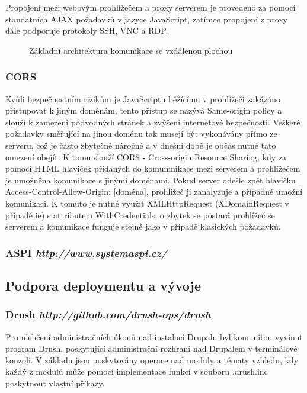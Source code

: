 Propojení mezi webovým prohlížečem a proxy serverem je provedeno za pomocí standatních AJAX požadavků v jazyce JavaScript, zatímco propojení z proxy dále podporuje protokoly SSH, VNC a RDP.

\begin{figure}[htp] 
  \caption{Základní architektura komunikace se vzdálenou plochou}
  \label{fig:arch_core}
\end{figure}  

\subsubsection*{CORS} 
Kvůli bezpečnostním rizikům je JavaScriptu běžícímu v prohlížeči zakázáno přistupovat k jiným doménám, tento přístup se nazývá Same-origin policy a slouží k zamezení podvodných stránek a zvýšení internetové bezpečnosti. Veškeré požadavky směřující na jinou doménu tak musejí být vykonávány přímo ze serveru, což je často zbytečně náročné a v dnešní době je občas nutné tato omezení obejít. K tomu slouží CORS - Cross-origin Resource Sharing, kdy za pomocí HTML hlaviček přidaných do komumnikace mezi serverem a prohlížečem je umožněna komunikace s jinými doménami. Pokud server odešle zpět hlavičku Access-Control-Allow-Origin: [doména], prohlížeč ji zanalyzuje a případně umožní komunikaci. K tomuto je nutné využít XMLHttpRequest (XDomainRequest v případě \gls{ie}) s attributem WithCredentials, o zbytek se postará prohlížeč se serverem a komunikace funguje stejně jako v případě klasických požadavků.

\subsubsection*{ASPI \hfill \emph{http://www.systemaspi.cz/}}

\subsection{Podpora deploymentu a vývoje}

\subsubsection*{Drush \hfill \emph{http://github.com/drush-ops/drush}}
Pro ulehčení administračních úkonů nad instalací Drupalu byl komunitou vyvinut program Drush, poskytující administrační rozhraní nad Drupalem v terminálové konzoli. V základu jsou poskytovány operace nad moduly a tématy vzhledu, kdy každý z modulů může pomocí implementace funkcí v souboru .drush.inc poskytnout vlastní příkazy.

